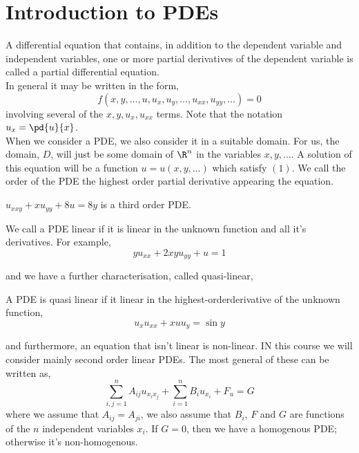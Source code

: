 
\section{Introduction to PDEs}
A differential equation that contains, in addition to the dependent variable and independent variables, one or more partial derivatives of the dependent variable is called a partial differential equation.\\

In general it may be written in the form,
\begin{equation}
  f(x, y, \dots, u, u_x, u_y, \dots, u_{xx}, u_{yy}, \dots) = 0
\end{equation}
involving several of the $x, y, u_{x}, u_{xx}$ terms. Note that the notation $u_x = \pd{u}{x}$.\\

When we consider a PDE, we also consider it in a suitable domain. For us, the domain, $D$, will just be some domain of $\R^n$ in the variables $x, y, \dots$. A solution of this equation will be a function $u = u(x, y, \dots)$ which satisfy $(1)$. We call the order of the PDE the highest order partial derivative appearing the equation.
\begin{eg}
  $u_{xxy} + xu_{yy} + 8u = 8y$ is a third order PDE.
\end{eg}

\begin{ndefi}[Linear]
  We call a PDE linear if it is linear in the unknown function and all it's derivatives. For example,
  $$ yu_{xx} + 2xyu_{yy} + u = 1 $$
\end{ndefi}

and we have a further characterisation, called quasi-linear,

\begin{ndefi}
  A PDE is quasi linear if it linear in the highest-orderderivative of the unknown function,
  $$ u_xu_{xx} + xuu_y = \sin y $$
\end{ndefi}

and furthermore, an equation that isn't linear is non-linear. IN this course we will consider mainly second order linear PDEs. The most general of these can be written as,
$$ \sum_{i, j = 1}^n A_{ij}u_{x_ix_j} + \sum_{i=1}^n B_iu_{x_i} + F_u = G $$
where we assume that $A_{ij} = A_{ji}$, we also assume that $B_i$, $F$ and $G$ are functions of the $n$ independent variables $x_i$. If $G = 0$, then we have a homogenous PDE; otherwise it's non-homogenous.\\

